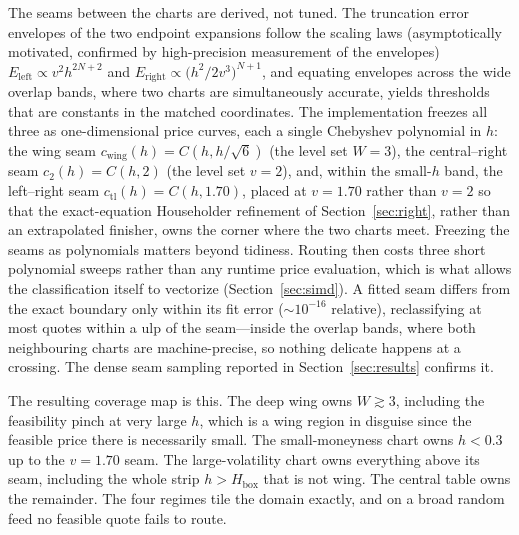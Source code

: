 \documentclass[11pt]{article}
\begin{document}
The seams between the charts are derived, not tuned. The truncation error envelopes of the two endpoint expansions follow the scaling laws (asymptotically motivated, confirmed by high-precision measurement of the envelopes) $E_{\mathrm{left}}\propto v^2h^{2N+2}$ and $E_{\mathrm{right}}\propto\bigl(h^2/2v^3\bigr)^{N+1}$, and equating envelopes across the wide overlap bands, where two charts are simultaneously accurate, yields thresholds that are constants in the matched coordinates. The implementation freezes all three as one-dimensional price curves, each a single Chebyshev polynomial in $h$: the wing seam $c_{\mathrm{wing}}(h)=C(h,h/\sqrt6)$ (the level set $W=3$), the central--right seam $c_2(h)=C(h,2)$ (the level set $v=2$), and, within the small-$h$ band, the left--right seam $c_{\mathrm{tl}}(h)=C(h,1.70)$, placed at $v=1.70$ rather than $v=2$ so that the exact-equation Householder refinement of Section~\ref{sec:right}, rather than an extrapolated finisher, owns the corner where the two charts meet. Freezing the seams as polynomials matters beyond tidiness. Routing then costs three short polynomial sweeps rather than any runtime price evaluation, which is what allows the classification itself to vectorize (Section~\ref{sec:simd}). A fitted seam differs from the exact boundary only within its fit error ($\sim10^{-16}$ relative), reclassifying at most quotes within a ulp of the seam---inside the overlap bands, where both neighbouring charts are machine-precise, so nothing delicate happens at a crossing. The dense seam sampling reported in Section~\ref{sec:results} confirms it.

The resulting coverage map is this. The deep wing owns $W\gtrsim3$, including the feasibility pinch at very large $h$, which is a wing region in disguise since the feasible price there is necessarily small. The small-moneyness chart owns $h<0.3$ up to the $v=1.70$ seam. The large-volatility chart owns everything above its seam, including the whole strip $h>H_{\mathrm{box}}$ that is not wing. The central table owns the remainder. The four regimes tile the domain exactly, and on a broad random feed no feasible quote fails to route.
\end{document}
